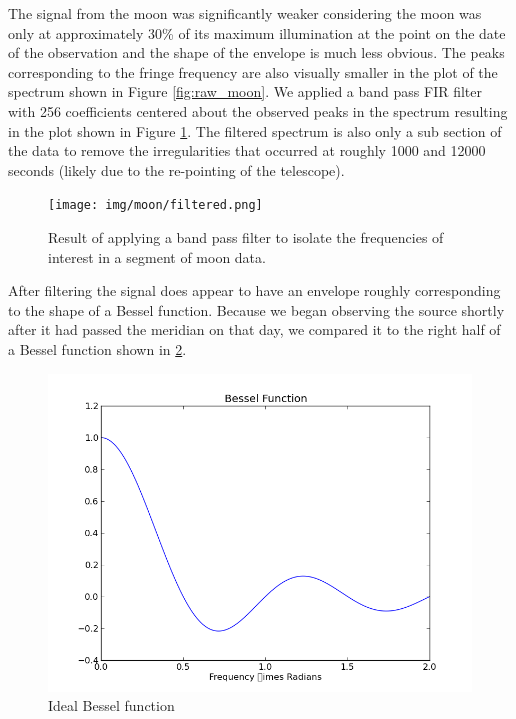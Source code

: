 \documentclass{article}
\begin{document}
    The signal from the moon was significantly weaker considering the moon was
    only at approximately 30\% of its maximum illumination at the point on the
    date of the observation and the shape of the envelope is much less obvious.
    The peaks corresponding to the fringe frequency are also visually smaller in
    the plot of the spectrum shown in Figure \ref{fig:raw_moon}. We applied a
    band pass FIR filter with 256 coefficients centered about the observed peaks
    in the spectrum resulting in the plot shown in Figure
    \ref{fig:filtered_moon}. The filtered spectrum is also only a sub section of
    the data to remove the irregularities that occurred at roughly 1000 and
    12000 seconds (likely due to the re-pointing of the telescope).

    \begin{figure}[ht!]
    \centering
    \texttt{[image: img/moon/filtered.png]}
    \caption{Result of applying a band pass filter to isolate the frequencies of
    interest in a segment of moon data.}
    \label{fig:filtered_moon}
    \end{figure}

    After filtering the signal does appear to have an envelope roughly
    corresponding to the shape of a Bessel function. Because we began observing
    the source shortly after it had passed the meridian on that day, we compared
    it to the right half of a Bessel function shown in \ref{fig:bessel_moon}.

    \begin{figure}[h!]
    \centering
    \includegraphics[scale=0.5]{img/moon/bessel.png}
    \caption{Ideal Bessel function}
    \label{fig:bessel_moon}
    \end{figure}
\end{document}
